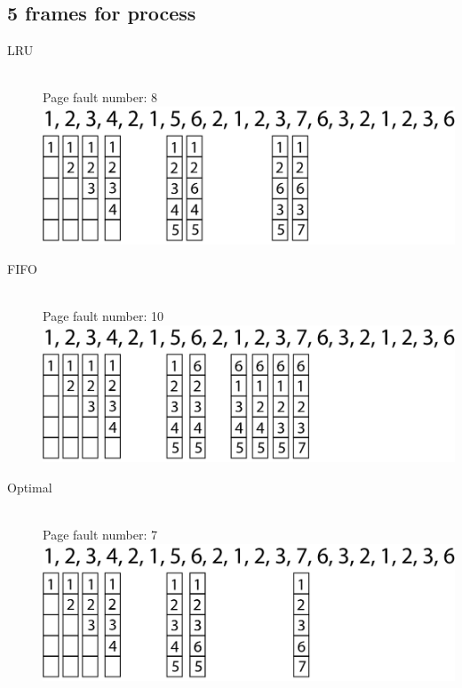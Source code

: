 \documentclass{article}
\begin{document}
\subsection{5 frames for process}
\begin{description}
    \item[LRU] \hfill \\ 
    Page fault number: 8\\
    \includegraphics[width=1\linewidth]{./LRU5.png} 
    \item[FIFO] \hfill \\
    Page fault number: 10\\
    \includegraphics[width=1\linewidth]{./FIFO5.png} 
    \item[Optimal] \hfill \\
    Page fault number: 7\\
    \includegraphics[width=1\linewidth]{./Optimal5.png} 
\end{description}
\newpage
\end{document}
